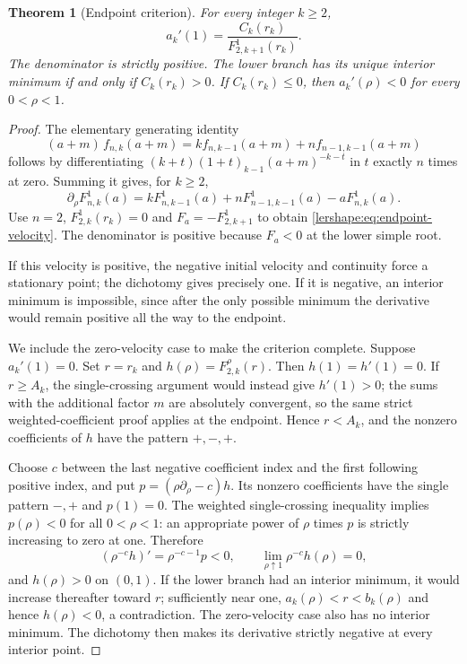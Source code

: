 \documentclass[11pt,a4paper]{article}
\numberwithin{equation}{section}
\newtheorem{theorem}{Theorem}[section]
\theoremstyle{definition}
\theoremstyle{remark}
\begin{document}
\begin{theorem}[Endpoint criterion]
\label{lershape:thm:criterion}
For every integer $k\geq2$,
\begin{equation}\label{lershape:eq:endpoint-velocity}
 a_k'(1)=\frac{C_k(r_k)}{F_{2,k+1}^{1}(r_k)}.
\end{equation}
The denominator is strictly positive. The lower branch has its unique
interior minimum if and only if $C_k(r_k)>0$. If $C_k(r_k)\leq0$,
then $a_k'(\rho)<0$ for every $0<\rho<1$.
\end{theorem}

\begin{proof}
The elementary generating identity
\[
 (a+m)\,f_{n,k}(a+m)
 =k f_{n,k-1}(a+m)+n f_{n-1,k-1}(a+m)
\]
follows by differentiating $(k+t)(1+t)_{k-1}(a+m)^{-k-t}$ in
$t$ exactly $n$ times at zero. Summing it gives, for $k\geq2$,
\begin{equation}\label{lershape:eq:rho-endpoint}
 \partial_\rho F_{n,k}^{1}(a)
 =kF_{n,k-1}^{1}(a)+nF_{n-1,k-1}^{1}(a)-aF_{n,k}^{1}(a).
\end{equation}
Use $n=2$, $F_{2,k}^{1}(r_k)=0$ and
$F_a=-F_{2,k+1}^{1}$ to obtain
\eqref{lershape:eq:endpoint-velocity}. The denominator is positive
because $F_a<0$ at the lower simple root.

If this velocity is positive, the negative initial velocity and
continuity force a stationary point; the dichotomy gives precisely one.
If it is negative, an interior minimum is impossible, since after the
only possible minimum the derivative would remain positive all the way
to the endpoint.

We include the zero-velocity case to make the criterion complete.
Suppose $a_k'(1)=0$. Set $r=r_k$ and $h(\rho)=F_{2,k}^{\rho}(r)$.
Then $h(1)=h'(1)=0$. If $r\geq A_k$, the single-crossing argument
would instead give $h'(1)>0$; the sums with the additional factor $m$
are absolutely convergent, so the same strict weighted-coefficient
proof applies at the endpoint. Hence $r<A_k$, and the nonzero
coefficients of $h$ have the pattern $+,-,+$.

Choose $c$ between the last negative coefficient index and the first
following positive index, and put $p=(\rho\partial_\rho-c)h$.
Its nonzero coefficients have the single pattern $-,+$ and
$p(1)=0$. The weighted single-crossing inequality implies
$p(\rho)<0$ for all $0<\rho<1$: an appropriate power of $\rho$
times $p$ is strictly increasing to zero at one. Therefore
\[
 (\rho^{-c}h)'=\rho^{-c-1}p<0,
 \qquad \lim_{\rho\uparrow1}\rho^{-c}h(\rho)=0,
\]
and $h(\rho)>0$ on $(0,1)$. If the lower branch had an interior
minimum, it would increase thereafter toward $r$; sufficiently near
one, $a_k(\rho)<r<b_k(\rho)$ and hence $h(\rho)<0$, a contradiction.
The zero-velocity case also has no interior minimum. The dichotomy
then makes its derivative strictly negative at every interior point.
\end{proof}
\end{document}
